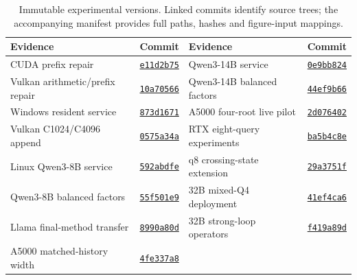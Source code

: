 \begin{table}[t]
\centering\footnotesize\tighttable
\caption{Immutable experimental versions. Linked commits identify source trees; the accompanying manifest provides full paths, hashes and figure-input mappings.}
\label{tab:source-versions}
\begin{tabularx}{\textwidth}{@{}YlYl@{}}\toprule
Evidence & Commit & Evidence & Commit\\\midrule
CUDA prefix repair & \href{https://github.com/leecdiang/HeteroSpec/tree/e11d2b75d82422409ba2b701aa38c59f36acc50b}{\texttt{e11d2b75}} & Qwen3-14B service & \href{https://github.com/leecdiang/HeteroSpec/tree/0e9bb82432dc0a860a43ab9ba1c034f41176fe05}{\texttt{0e9bb824}} \\
Vulkan arithmetic/prefix repair & \href{https://github.com/leecdiang/HeteroSpec/tree/10a70566ce01ab707dbdcc57d8270c1434088f07}{\texttt{10a70566}} & Qwen3-14B balanced factors & \href{https://github.com/leecdiang/HeteroSpec/tree/44ef9b6654cfe3a800059d7311f8ecf73ffd8983}{\texttt{44ef9b66}} \\
Windows resident service & \href{https://github.com/leecdiang/HeteroSpec/tree/873d16712fbf3bc04f54e9b3753515c5dbebb60f}{\texttt{873d1671}} & A5000 four-root live pilot & \href{https://github.com/leecdiang/HeteroSpec/tree/2d076402b4ddc29c92549d360cd974af40d3f0a4}{\texttt{2d076402}} \\
Vulkan C1024/C4096 append & \href{https://github.com/leecdiang/HeteroSpec/tree/0575a34a88acff8298191e172205bf8726fe4174}{\texttt{0575a34a}} & RTX eight-query experiments & \href{https://github.com/leecdiang/HeteroSpec/tree/ba5b4c8e01d50d4bfaab1ac3908f798347be063a}{\texttt{ba5b4c8e}} \\
Linux Qwen3-8B service & \href{https://github.com/leecdiang/HeteroSpec/tree/592abdfe9267fd97ecbde18cd0ee9a1bfc319e20}{\texttt{592abdfe}} & q8 crossing-state extension & \href{https://github.com/leecdiang/HeteroSpec/tree/29a3751f3745668f287a8dcc3b2ad2c0d15bdc43}{\texttt{29a3751f}} \\
Qwen3-8B balanced factors & \href{https://github.com/leecdiang/HeteroSpec/tree/55f501e9a93013a4b4d82cc4967e82b8d9054a81}{\texttt{55f501e9}} & 32B mixed-Q4 deployment & \href{https://github.com/leecdiang/HeteroSpec/tree/41ef4ca6bbc382c02fb97ebea874651fbf9fd4ac}{\texttt{41ef4ca6}} \\
Llama final-method transfer & \href{https://github.com/leecdiang/HeteroSpec/tree/8990a80da23f75c071d6d161c8c79a2dc1347bd7}{\texttt{8990a80d}} & 32B strong-loop operators & \href{https://github.com/leecdiang/HeteroSpec/tree/f419a89d54f4ec93b4c9c328b4ea9f416ae3c989}{\texttt{f419a89d}} \\
A5000 matched-history width & \href{https://github.com/leecdiang/HeteroSpec/tree/4fe337a8ff349d547023f9dd60b8e114e5323207}{\texttt{4fe337a8}} & & \\
\bottomrule
\end{tabularx}
\end{table}


